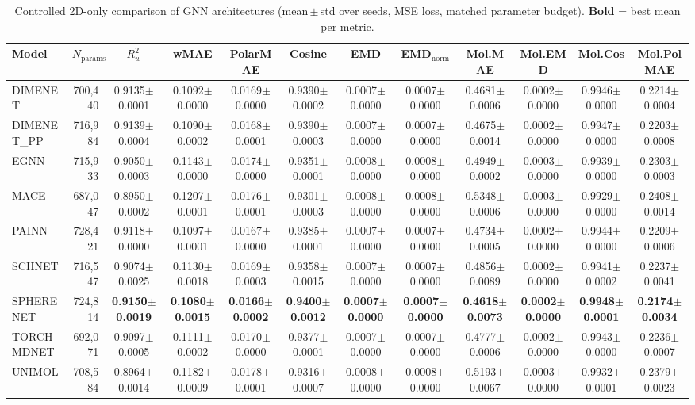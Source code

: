 \begin{table}[ht]
\centering
\caption{Controlled 2D-only comparison of GNN architectures (mean\,$\pm$\,std over seeds, MSE loss, matched parameter budget). \textbf{Bold} = best mean per metric.}
\label{tab:benchmark_2d_mse}
\small
\begin{tabular}{l r c c c c c c c c c c }
\toprule
Model & $N_{\text{params}}$ & $R^2_w$ & wMAE & PolarMAE & Cosine & EMD & EMD$_\mathrm{norm}$ & Mol.MAE & Mol.EMD & Mol.Cos & Mol.PolMAE \\
\midrule
DIMENET & 700,440 & 0.9135$\pm$0.0001 & 0.1092$\pm$0.0000 & 0.0169$\pm$0.0000 & 0.9390$\pm$0.0002 & 0.0007$\pm$0.0000 & 0.0007$\pm$0.0000 & 0.4681$\pm$0.0006 & 0.0002$\pm$0.0000 & 0.9946$\pm$0.0000 & 0.2214$\pm$0.0004 \\
DIMENET_PP & 716,984 & 0.9139$\pm$0.0004 & 0.1090$\pm$0.0002 & 0.0168$\pm$0.0001 & 0.9390$\pm$0.0003 & 0.0007$\pm$0.0000 & 0.0007$\pm$0.0000 & 0.4675$\pm$0.0014 & 0.0002$\pm$0.0000 & 0.9947$\pm$0.0000 & 0.2203$\pm$0.0008 \\
EGNN & 715,933 & 0.9050$\pm$0.0003 & 0.1143$\pm$0.0000 & 0.0174$\pm$0.0000 & 0.9351$\pm$0.0001 & 0.0008$\pm$0.0000 & 0.0008$\pm$0.0000 & 0.4949$\pm$0.0002 & 0.0003$\pm$0.0000 & 0.9939$\pm$0.0000 & 0.2303$\pm$0.0003 \\
MACE & 687,047 & 0.8950$\pm$0.0002 & 0.1207$\pm$0.0001 & 0.0176$\pm$0.0001 & 0.9301$\pm$0.0003 & 0.0008$\pm$0.0000 & 0.0008$\pm$0.0000 & 0.5348$\pm$0.0006 & 0.0003$\pm$0.0000 & 0.9929$\pm$0.0000 & 0.2408$\pm$0.0014 \\
PAINN & 728,421 & 0.9118$\pm$0.0000 & 0.1097$\pm$0.0001 & 0.0167$\pm$0.0000 & 0.9385$\pm$0.0001 & 0.0007$\pm$0.0000 & 0.0007$\pm$0.0000 & 0.4734$\pm$0.0005 & 0.0002$\pm$0.0000 & 0.9944$\pm$0.0000 & 0.2209$\pm$0.0006 \\
SCHNET & 716,547 & 0.9074$\pm$0.0025 & 0.1130$\pm$0.0018 & 0.0169$\pm$0.0003 & 0.9358$\pm$0.0015 & 0.0007$\pm$0.0000 & 0.0007$\pm$0.0000 & 0.4856$\pm$0.0089 & 0.0002$\pm$0.0000 & 0.9941$\pm$0.0002 & 0.2237$\pm$0.0041 \\
SPHERENET & 724,814 & \textbf{0.9150$\pm$0.0019} & \textbf{0.1080$\pm$0.0015} & \textbf{0.0166$\pm$0.0002} & \textbf{0.9400$\pm$0.0012} & \textbf{0.0007$\pm$0.0000} & \textbf{0.0007$\pm$0.0000} & \textbf{0.4618$\pm$0.0073} & \textbf{0.0002$\pm$0.0000} & \textbf{0.9948$\pm$0.0001} & \textbf{0.2174$\pm$0.0034} \\
TORCHMDNET & 692,071 & 0.9097$\pm$0.0005 & 0.1111$\pm$0.0002 & 0.0170$\pm$0.0000 & 0.9377$\pm$0.0001 & 0.0007$\pm$0.0000 & 0.0007$\pm$0.0000 & 0.4777$\pm$0.0006 & 0.0002$\pm$0.0000 & 0.9943$\pm$0.0000 & 0.2236$\pm$0.0007 \\
UNIMOL & 708,584 & 0.8964$\pm$0.0014 & 0.1182$\pm$0.0009 & 0.0178$\pm$0.0001 & 0.9316$\pm$0.0007 & 0.0008$\pm$0.0000 & 0.0008$\pm$0.0000 & 0.5193$\pm$0.0067 & 0.0003$\pm$0.0000 & 0.9932$\pm$0.0001 & 0.2379$\pm$0.0023 \\
\bottomrule
\end{tabular}
\end{table}
